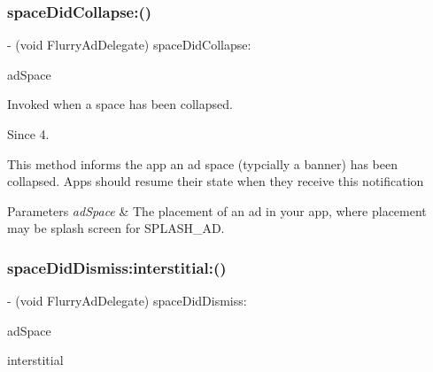 \subsubsection{\texorpdfstring{space\+Did\+Collapse\+:()}{spaceDidCollapse:()}}
{\footnotesize\ttfamily -\/ (void Flurry\+Ad\+Delegate) space\+Did\+Collapse\+: \begin{DoxyParamCaption}\item[{(N\+S\+String $\ast$)}]{ad\+Space }\end{DoxyParamCaption}\hspace{0.3cm}{\ttfamily [optional]}}



Invoked when a space has been collapsed. 

\begin{DoxySince}{Since}
4.
\end{DoxySince}
This method informs the app an ad space (typcially a banner) has been collapsed. Apps should resume their state when they receive this notification


\begin{DoxyParams}{Parameters}
{\em ad\+Space} & The placement of an ad in your app, where placement may be splash screen for S\+P\+L\+A\+S\+H\+\_\+\+AD. \\
\hline
\end{DoxyParams}
\mbox{\label{protocolFlurryAdDelegate_01-p_a18f10b96c0332ed1c482bc835d8867a3}} 
\subsubsection{\texorpdfstring{space\+Did\+Dismiss\+:interstitial\+:()}{spaceDidDismiss:interstitial:()}}
{\footnotesize\ttfamily -\/ (void Flurry\+Ad\+Delegate) space\+Did\+Dismiss\+: \begin{DoxyParamCaption}\item[{(N\+S\+String $\ast$)}]{ad\+Space }\item[{interstitial:(B\+O\+OL)}]{interstitial }\end{DoxyParamCaption}\hspace{0.3cm}{\ttfamily [optional]}}



